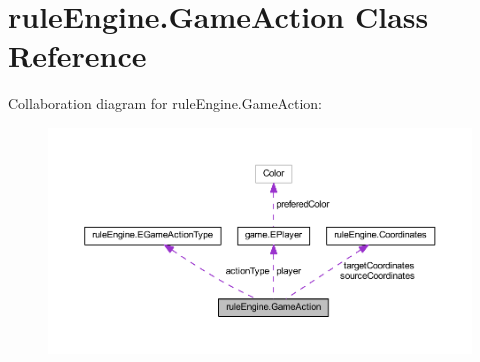 \hypertarget{classrule_engine_1_1_game_action}{}\section{rule\+Engine.\+Game\+Action Class Reference}
\label{classrule_engine_1_1_game_action}


Collaboration diagram for rule\+Engine.\+Game\+Action\+:
\nopagebreak
\begin{figure}[H]
\begin{center}
\leavevmode
\includegraphics[width=350pt]{classrule_engine_1_1_game_action__coll__graph}
\end{center}
\end{figure}
